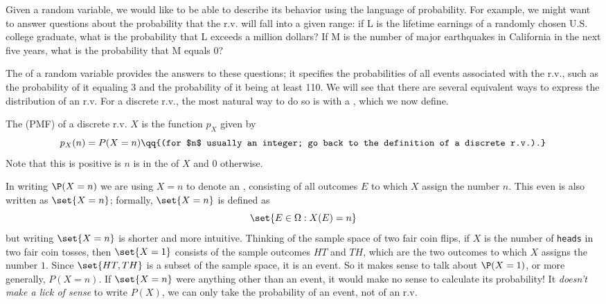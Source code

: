 \documentclass{ccg-topic}
\begin{document}
Given a random variable, we would like to be able to describe its behavior using the language of probability. For example, we might want to answer questions about the probability that the r.v. will fall into a given range: if L is the lifetime earnings of a randomly chosen U.S. college graduate, what is the probability that L exceeds a million dollars? If M is the number of major earthquakes in California in the next five years, what is the probability that M equals 0? 

The  of a random variable provides the answers to these questions; it specifies the probabilities of all events associated with the r.v., such as the probability of it equaling 3 and the probability of it being at least 110. We will see that there are several equivalent ways to express the distribution of an r.v. For a discrete r.v., the most natural way to do so is with a , which we now define.

\begin{defn}
    \label{defn:probability_mass_function}
    The  (PMF) of a discrete r.v. $X$ is the function $p_X$ given by 
\begin{equation*}
    \label{pmf}
    p_X(n) = P(X = n) \qq{(for $n$ usually an integer; go back to the definition of a discrete r.v.).}
\end{equation*}
Note that this is positive is $n$ is in the  of $X$ and $0$ otherwise.
\end{defn}

\begin{note}[Warning!]
    \label{rem:warning}
    In writing $\P(X= n)$ we are using $X=n$ to denote an , consisting of all outcomes $E$ to which $X$ assign the number $n$. This even is also written as $\set{X = n}$; formally, $\set{X= n}$ is defined as 
\begin{equation*}
    \label{preimage}
    \set{E \in \Omega : X(E) = n}
\end{equation*}
but writing $\set{X=n}$ is shorter and more intuitive. Thinking of the sample space of two fair coin flips, if $X$ is the number of \texttt{heads} in two fair coin tosses, then $\set{X = 1}$ consists of the sample outcomes $HT$ and $TH$, which are the two outcomes to which $X$ assigns the number $1$. Since $\set{HT, TH}$ is a subset of the sample space, it is an event. So it makes sense to talk about $\P(X=1)$, or more generally, $P(X=n)$. If $\set{X=n}$ were anything other than an event, it would make no sense to calculate its probability! It \emph{doesn't make a lick of sense} to write $P(X)$, we can only take the probability of an event, not of an r.v.
\end{note}
\end{document}
